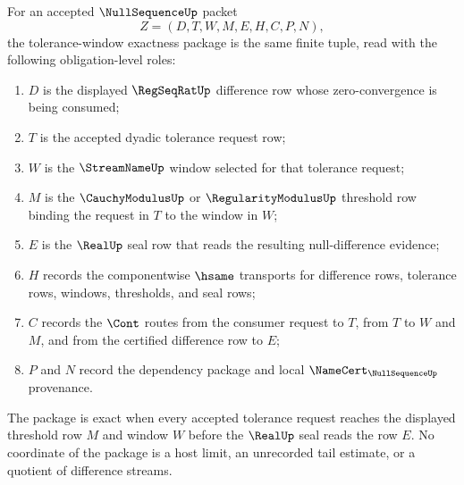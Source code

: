 \begin{definition}
\label{def:null-sequence-tolerance-window-exactness-package}
For an accepted $\NullSequenceUp$ packet
$$
Z=(D,T,W,M,E,H,C,P,N),
$$
the tolerance-window exactness package is the same finite tuple, read with the following obligation-level roles:
\begin{enumerate}
\item $D$ is the displayed $\RegSeqRatUp$ difference row whose zero-convergence is being consumed;
\item $T$ is the accepted dyadic tolerance request row;
\item $W$ is the $\StreamNameUp$ window selected for that tolerance request;
\item $M$ is the $\CauchyModulusUp$ or $\RegularityModulusUp$ threshold row binding the request in $T$ to the window in $W$;
\item $E$ is the $\RealUp$ seal row that reads the resulting null-difference evidence;
\item $H$ records the componentwise $\hsame$ transports for difference rows, tolerance rows, windows, thresholds, and seal rows;
\item $C$ records the $\Cont$ routes from the consumer request to $T$, from $T$ to $W$ and $M$, and from the certified difference row to $E$;
\item $P$ and $N$ record the dependency package and local $\NameCert_{\NullSequenceUp}$ provenance.
\end{enumerate}
The package is exact when every accepted tolerance request reaches the displayed threshold row $M$ and window $W$ before the $\RealUp$ seal reads the row $E$. No coordinate of the package is a host limit, an unrecorded tail estimate, or a quotient of difference streams.
\end{definition}

